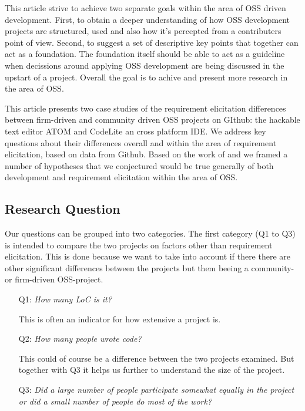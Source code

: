 \documentclass[a4paper,11pt]{article}
\begin{document}
{%

This article strive to achieve two separate goals within the area of OSS driven development. First, to obtain a deeper understanding of how OSS development projects are structured, used and also how it's percepted from a contributers point of view. Second, to suggest a set of descriptive key points that together can act as a foundation. The foundation itself should be able to act as a guideline when decissions around applying OSS development are being discussed in the upstart of a project. Overall the goal is to achive and present more research in the area of OSS.

This article presents two case studies of the requirement elicitation differences between firm-driven and community driven OSS projects on GIthub: the hackable text editor ATOM and CodeLite an cross platform IDE. We address key questions about their differences overall and within the area of requirement elicitation, based on data from Github. Based on the work of \cite{Mockus2002a} and \cite{Noll} we framed a number of hypotheses that we conjectured would be true generally of both development and requirement elicitation within the area of OSS. 


\subsection{Research Question}
Our questions can be grouped into two categories. The first category (Q1 to Q3) is intended to compare the two projects on factors other than requirement elicitation. This is done because we want to take into account if there there are other significant differences between the projects but them beeing a community- or firm-driven OSS-project.
\begin{itemize}
	\item[Q1:]\emph{How many LoC is it?}
	
	This is often an indicator for how extensive a project is.
	\item[Q2:]\emph{How many people wrote code?}
	
	This could of course be a difference between the two projects examined. But together with Q3 it helps us further to understand the size of the project.
	\item[Q3:]\emph{Did a large number of people participate somewhat equally in the project or did a small number of people do most of the work?}
	

\end{itemize}}
\end{document}
